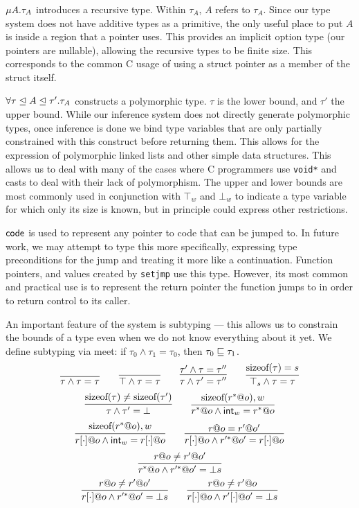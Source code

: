 $\mu A. \tau_A$ introduces a recursive type. Within $\tau_A$, $A$ refers to $\tau_A$. Since our type system does not have additive types as a primitive, the only useful place to put $A$ is inside a region that a pointer uses. This provides an implicit option type (our pointers are nullable), allowing the recursive types to be finite size. This corresponds to the common C usage of using a struct pointer as a member of the struct itself.

$\forall \tau\mathrel{\unlhd} A\mathrel{\unlhd} \tau'.\tau_A$ constructs a polymorphic type. $\tau$ is the lower bound, and $\tau'$ the upper bound. While our inference system does not directly generate polymorphic types, once inference is done we bind type variables that are only partially constrained with this construct before returning them. This allows for the expression of polymorphic linked lists and other simple data structures. This allows us to deal with many of the cases where C programmers use \texttt{void*} and casts to deal with their lack of polymorphism. The upper and lower bounds are most commonly used in conjunction with $\top_{w}$ and $\bot_{w}$ to indicate a type variable for which only its size is known, but in principle could express other restrictions.

$\mathsf{code}$ is used to represent any pointer to code that can be jumped to. In future work, we may attempt to type this more specifically, expressing type preconditions for the jump and treating it more like a continuation. Function pointers, and values created by \texttt{setjmp} use this type. However, its most common and practical use is to represent the return pointer the function jumps to in order to return control to its caller.

An important feature of the system is subtyping --- this allows us to constrain the bounds of a type even when we do not know everything about it yet.
We define subtyping via meet: if $\tau_0 \wedge \tau_1 = \tau_0$, then $\tau_0 \sqsubseteq \tau_1$.
\[
\infer{\tau \wedge \tau = \tau}{}
\qquad
\infer{\utop \wedge \tau = \tau}{}
\qquad
\infer{\tau \wedge \tau' = \tau''}{\tau' \wedge \tau = \tau''}
\qquad
\infer{\top_{s} \wedge \tau = \tau}{\textrm{sizeof}(\tau) = s}
\]
\[
\infer{\tau \wedge \tau' = \ubot}{\textrm{sizeof}(\tau) \neq \textrm{sizeof}(\tau')}
\qquad
\infer{\lptr{r}{o} \wedge \tint{w} = \lptr{r}{o}}{\textrm{sizeof}(\lptr{r}{o}), w}
\]
\[
\infer{\aptr{r}{o} \wedge \tint{w} = \aptr{r}{o}}{\textrm{sizeof}(\lptr{r}{o}), w}
\qquad
\infer{\aptr{r}{o} \wedge \lptr{r'}{o'} = \aptr{r}{o}}{r@o = r'@o'}
\]
\[
\infer{\lptr{r}{o} \wedge \lptr{r'}{o'} = \bot{s}}{r@o \neq r'@o'}
\]
\[
\infer{\aptr{r}{o} \wedge \lptr{r'}{o'} = \bot{s}}{r@o \neq r'@o'}
\qquad
\infer{\aptr{r}{o} \wedge \aptr{r'}{o'} = \bot{s}}{r@o \neq r'@o}
\]

